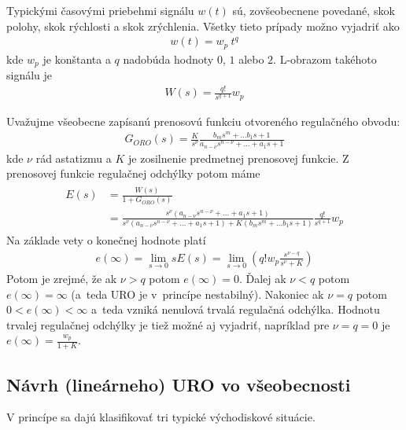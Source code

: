 \documentclass[a4paper, 10pt, ]{article}
\begin{document}
Typickými časovými priebehmi signálu $w(t)$ sú, zovšeobecnene povedané, skok polohy, skok rýchlosti a skok zrýchlenia. Všetky tieto prípady možno vyjadriť ako
\begin{align}
    w(t) = w_p \ t^q
\end{align}
kde $w_p$ je konštanta a $q$ nadobúda hodnoty $0$, $1$ alebo $2$. L-obrazom takéhoto signálu je
\begin{align}
    W(s) = \frac{q!}{s^{q+1}}w_p
\end{align}




Uvažujme všeobecne zapísanú prenosovú funkciu otvoreného regulačného obvodu:
\begin{align}
    G_{ORO}(s) = \frac{K}{s^\nu} \frac{b_m s^m + \ldots b_1 s + 1}{a_{n-\nu}s^{n-\nu} + \ldots + a_1s + 1}
\end{align}
kde $\nu$ rád astatizmu a $K$ je zosilnenie predmetnej prenosovej funkcie. Z prenosovej funkcie  regulačnej odchýlky potom máme
\begin{align}
\begin{aligned}
    E(s) &= \frac{W(s)}{1 + G_{ORO}(s)}
    \\&= \frac{s^\nu \left( a_{n-\nu}s^{n-\nu} + \ldots + a_1s + 1 \right)}{s^\nu \left( a_{n-\nu}s^{n-\nu} + \ldots + a_1s + 1 \right) + K \left( b_m s^m + \ldots b_1 s + 1 \right)}
    \frac{q!}{s^{q+1}}w_p
\end{aligned}
\end{align}
Na základe vety o konečnej hodnote platí
\begin{align}
    e(\infty) = \lim_{s\to 0} s E(s) =  \lim_{s\to 0} \left( q! w_p \frac{s^{\nu-q}}{s^\nu + K} \right)
\end{align}
Potom je zrejmé, že ak $\nu > q$ potom $e(\infty) = 0$. Ďalej ak $\nu < q$ potom $e(\infty) = \infty$ (a~teda URO je v~princípe nestabilný). Nakoniec ak $\nu = q$ potom $ 0 < e(\infty) < \infty$ a~teda vzniká nenulová trvalá regulačná odchýlka. Hodnotu trvalej regulačnej odchýlky je tiež možné aj vyjadriť, napríklad pre $\nu = q = 0$ je $e(\infty) = \frac{w_p}{1 + K}$.








\subsection{Návrh (lineárneho) URO vo všeobecnosti}

V princípe sa dajú klasifikovať tri typické východiskové situácie.
\end{document}
